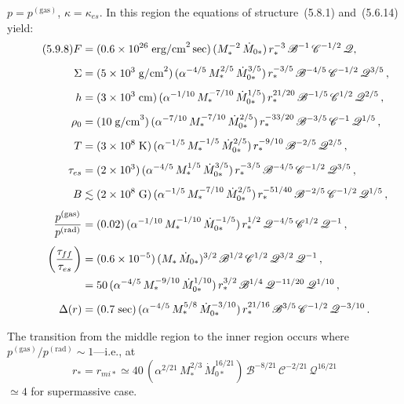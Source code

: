 $p = p^{(\text{gas})}$, $\kappa = \kappa_{es}$.  In this region the equations of structure~(5.8.1) and~(5.6.14)
yield:
%
\begin{align}
\tag{5.9.8}
F &= (0.6 \times 10^{26}\;\text{erg/cm}^2\,\text{sec})\,
    (M_*^{-2}\,\dot{M}_{0*})\,
    r_*^{-3}\,\mathscr{B}^{-1}\,\mathscr{C}^{-1/2}\,\mathscr{Q}, \notag \\[4pt]
%
\Sigma &= (5 \times 10^{3}\;\text{g/cm}^2)\,
    (\alpha^{-4/5}\,M_*^{2/5}\,\dot{M}_{0*}^{3/5})\,
    r_*^{-3/5}\,
    \mathscr{B}^{-4/5}\,\mathscr{C}^{-1/2}\,\mathscr{Q}^{3/5}\,, \notag \\[4pt]
%
h &= (3 \times 10^{3}\;\text{cm})\,
    (\alpha^{-1/10}\,M_*^{-7/10}\,\dot{M}_{0*}^{1/5})\,
    r_*^{21/20}\,
    \mathscr{B}^{-1/5}\,\mathscr{C}^{1/2}\,\mathscr{Q}^{2/5}\,, \notag \\[4pt]
%
\rho_0 &= (10\;\text{g/cm}^3)\,
    (\alpha^{-7/10}\,M_*^{-7/10}\,\dot{M}_{0*}^{2/5})\,
    r_*^{-33/20}\,
    \mathscr{B}^{-3/5}\,\mathscr{C}^{-1}\,\mathscr{Q}^{1/5}\,, \notag \\[4pt]
%
T &= (3 \times 10^{8}\;\text{K})\,
    (\alpha^{-1/5}\,M_*^{-1/5}\,\dot{M}_{0*}^{2/5})\,
    r_*^{-9/10}\,
    \mathscr{B}^{-2/5}\,\mathscr{Q}^{2/5}\,, \notag \\[4pt]
%
\tau_{es} &= (2 \times 10^{3})\,
    (\alpha^{-4/5}\,M_*^{1/5}\,\dot{M}_{0*}^{3/5})\,
    r_*^{-3/5}\,
    \mathscr{B}^{-4/5}\,\mathscr{C}^{-1/2}\,\mathscr{Q}^{3/5}\,, \notag \\[4pt]
%
B &\lesssim (2 \times 10^{8}\;\text{G})\,
    (\alpha^{-1/5}\,M_*^{-7/10}\,\dot{M}_{0*}^{2/5})\,
    r_*^{-51/40}\,
    \mathscr{B}^{-2/5}\,\mathscr{C}^{-1/2}\,\mathscr{Q}^{1/5}\,, \notag \\[4pt]
%
\frac{p^{(\text{gas})}}{p^{(\text{rad})}}
&= (0.02)\,(\alpha^{-1/10}\,M_*^{-1/10}\,\dot{M}_{0*}^{-1/5})\,
    r_*^{1/2}\,
    \mathscr{Q}^{-4/5}\,\mathscr{C}^{1/2}\,\mathscr{Q}^{-1}\,, \notag \\[4pt]
%
\biggl(\frac{\tau_{ff}}{\tau_{es}}\biggr)
&= (0.6 \times 10^{-5})\,
    (M_*\,\dot{M}_{0*})^{3/2}\,
    \mathscr{B}^{1/2}\,\mathscr{C}^{1/2}\,\mathscr{Q}^{3/2}\,\mathscr{Q}^{-1}\,, \notag \\
&= 50\,(\alpha^{-4/5}\,M_*^{-9/10}\,\dot{M}_{0*}^{1/10})\,
    r_*^{3/2}\,
    \mathscr{B}^{1/4}\,\mathscr{Q}^{-11/20}\,\mathscr{Q}^{1/10}\,, \notag \\[4pt]
%
\Delta(r) &= (0.7\;\text{sec})\,
    (\alpha^{-4/5}\,M_*^{5/8}\,\dot{M}_{0*}^{-3/10})\,
    r_*^{21/16}\,
    \mathscr{B}^{3/5}\,\mathscr{C}^{-1/2}\,\mathscr{Q}^{-3/10}\,. \notag
\end{align}

The transition from the middle region to the inner region occurs where
$p^{(\text{gas})}/p^{(\text{rad})} \sim 1$---i.e., at
%
\begin{equation}
\tag{5.9.9}
r_* = r_{mi*}
\simeq 40\,
(\alpha^{2/21}\,M_*^{2/3}\,\dot{M}_{0*}^{16/21})\,
\mathscr{B}^{-8/21}\,\mathscr{C}^{-2/21}\,\mathscr{Q}^{16/21}
\end{equation}
%
$\simeq 4$ for supermassive case.
